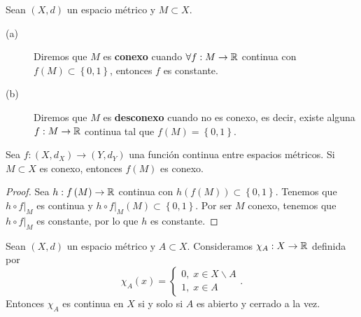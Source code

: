 \begin{definition}
Sean $\displaystyle \left(X,d\right) $ un espacio métrico y $\displaystyle M \subset X $. 
\begin{description}
	\item[(a)] Diremos que $\displaystyle M $ es \textbf{conexo} cuando $\displaystyle \forall f : M \to \mathbb{R} $ continua con $\displaystyle f\left(M\right) \subset \left\{ 0,1\right\}  $, entonces $\displaystyle f $ es constante. 
	\item[(b)] Diremos que $\displaystyle M $ es \textbf{desconexo} cuando no es conexo, es decir, existe alguna $\displaystyle f : M \to \mathbb{R} $ continua tal que $\displaystyle f\left(M\right) = \left\{ 0,1\right\}  $.
\end{description}
\end{definition}
\begin{theorem}
Sea $\displaystyle f : \left(X, d _{X}\right) \to \left(Y, d _{Y}\right) $ una función continua entre espacios métricos. Si $\displaystyle M \subset X $ es conexo, entonces $\displaystyle f\left(M\right) $ es conexo. 
\end{theorem}
\begin{proof}
	Sea $\displaystyle h : f\left(M\right) \to \mathbb{R} $ continua con $\displaystyle h\left(f\left(M\right)\right) \subset \left\{ 0,1\right\}  $. Tenemos que $\displaystyle h \circ f|_{M} $ es continua y $\displaystyle h \circ f|_{M}\left(M\right) \subset \left\{ 0,1\right\}  $. Por ser $\displaystyle M $ conexo, tenemos que $\displaystyle h \circ f|_{M} $ es constante, por lo que $\displaystyle h $ es constante. 
\end{proof}
\begin{lema}
Sean $\displaystyle \left(X,d \right) $ un espacio métrico y $\displaystyle A \subset X $. Consideramos $\displaystyle \chi_{A} : X \to \mathbb{R} $ definida por
\[\chi_{A}\left(x\right) = 
\begin{cases}
0, \; x \in X \backslash A \\
1, \; x \in A
\end{cases}
.\]
Entonces $\displaystyle \chi_{A} $ es continua en $\displaystyle X $ si y solo si $\displaystyle A $ es abierto y cerrado a la vez. 
\end{lema}
